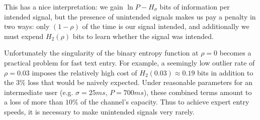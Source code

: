 This has a nice interpretation: we gain $\ln P - H_{\sigma}$ bits of information
per intended signal, but the presence of unintended signals makes us pay a penalty in two ways:
only $(1 - \rho)$ of the time is our signal intended, and additionally we must
expend $H_2(\rho)$ bits to learn whether the signal was intended.

Unfortunately the singularity of the binary entropy function
at $\rho = 0$ becomes a practical problem for fast text entry. For example, a
seemingly low outlier rate of $\rho = 0.03$ imposes the relatively
high cost of $H_2(0.03) \approx 0.19$ bits in addition to the
$3\%$ loss that would be naively expected.
Under reasonable parameters for an intermediate user (e.g. $\sigma = 25ms$, $P = 700ms$),
these combined terms amount to a loss of more than $10\%$ of the channel's capacity.
Thus to achieve expert entry speeds, it is necessary to
make unintended signals very rarely.

